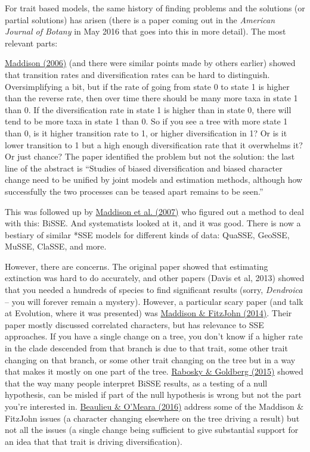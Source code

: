 \documentclass[]{book}
\theoremstyle{definition}
\theoremstyle{definition}
\theoremstyle{remark}
\begin{document}
For trait based models, the same history of finding problems and the
solutions (or partial solutions) has arisen (there is a paper coming out
in the \emph{American Journal of Botany} in May 2016 that goes into this
in more detail). The most relevant parts:

\href{http://onlinelibrary.wiley.com/doi/10.1111/j.0014-3820.2006.tb00517.x/abstract}{Maddison
(2006)} (and there were similar points made by others earlier) showed
that transition rates and diversification rates can be hard to
distinguish. Oversimplifying a bit, but if the rate of going from state
0 to state 1 is higher than the reverse rate, then over time there
should be many more taxa in state 1 than 0. If the diversification rate
in state 1 is higher than in state 0, there will tend to be more taxa in
state 1 than 0. So if you see a tree with more state 1 than 0, is it
higher transition rate to 1, or higher diversification in 1? Or is it
lower transition to 1 but a high enough diversification rate that it
overwhelms it? Or just chance? The paper identified the problem but not
the solution: the last line of the abstract is ``Studies of biased
diversification and biased character change need to be unified by joint
models and estimation methods, although how successfully the two
processes can be teased apart remains to be seen.''

This was followed up by
\href{http://sysbio.oxfordjournals.org/content/56/5/701.short}{Maddison
et al. (2007)} who figured out a method to deal with this: BiSSE. And
systematists looked at it, and it was good. There is now a bestiary of
similar *SSE models for different kinds of data: QuaSSE, GeoSSE, MuSSE,
ClaSSE, and more.

However, there are concerns. The original paper showed that estimating
extinction was hard to do accurately, and other papers (Davis et al,
2013) showed that you needed a hundreds of species to find significant
results (sorry, \emph{Dendroica} -- you will forever remain a mystery).
However, a particular scary paper (and talk at Evolution, where it was
presented) was
\href{https://sysbio.oxfordjournals.org/content/early/2014/10/23/sysbio.syu070.full}{Maddison
\& FitzJohn (2014)}. Their paper mostly discussed correlated characters,
but has relevance to SSE approaches. If you have a single change on a
tree, you don't know if a higher rate in the clade descended from that
branch is due to that trait, some other trait changing on that branch,
or some other trait changing on the tree but in a way that makes it
mostly on one part of the tree.
\href{http://sysbio.oxfordjournals.org/content/early/2015/01/18/sysbio.syu131}{Rabosky
\& Goldberg (2015)} showed that the way many people interpret BiSSE
results, as a testing of a null hypothesis, can be misled if part of the
null hypothesis is wrong but not the part you're interested in.
\href{http://sysbio.oxfordjournals.org/content/early/2016/03/25/sysbio.syw022.abstract}{Beaulieu
\& O'Meara (2016)} address some of the Maddison \& FitzJohn issues (a
character changing elsewhere on the tree driving a result) but not all
the issues (a single change being sufficient to give substantial support
for an idea that that trait is driving diversification).
\end{document}
